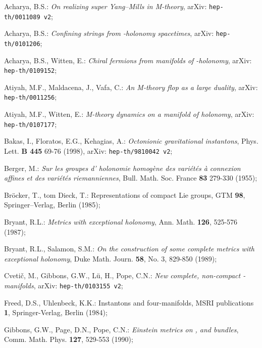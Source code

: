 \documentclass[a4paper,12pt,draft]{article}
\begin{document}
\begin{thebibliography}{99}

 Acharya, B.S.: {\it On realizing \coordHE{} super Yang--Mills in
M-theory}, arXiv: {\tt hep-th/0011089 v2};

 Acharya, B.S.: {\it Confining strings from \coordHE{}-holonomy
spacetimes}, arXiv: {\tt hep-th/0101206};

 Acharya, B.S., Witten, E.: {\it Chiral fermions from
manifolds of \coordHE{}-holonomy}, arXiv: {\tt hep-th/0109152};

 Atiyah, M.F., Maldacena, J., Vafa, C.: {\it An
M-theory flop as a large \coordHE{} duality}, arXiv: {\tt hep-th/0011256};

 Atiyah, M.F., Witten, E.: {\it M-theory dynamics on a
manifold of \coordHE{} holonomy}, arXiv: {\tt hep-th/0107177};

 Bakas, I., Floratos, E.G., Kehagias, A.: {\it
Octonionic gravitational instantons}, Phys. Lett. {\bf B 445} 69-76
(1998), arXiv: {\tt hep-th/9810042 v2};

 Berger, M.: {\it Sur les groupes d' holonomie homog\`ene des
vari\'et\'es \`a connexion affines et des vari\'et\'es riemanniennes},
Bull. Math. Soc. France {\bf 83} 279-330 (1955);

 Br\"ocker, T., tom Dieck, T.: Representations of compact
Lie groups, GTM {\bf 98}, Springer--Verlag, Berlin (1985);
 
 Bryant, R.L.: {\it Metrics with exceptional holonomy},
Ann. Math. {\bf 126}, 525-576 (1987);

 Bryant, R.L., Salamon, S.M.: {\it On the construction
of some complete metrics with exceptional holonomy}, Duke
Math. Journ. {\bf 58}, No. 3, 829-850 (1989);

 Cveti\v c, M., Gibbons, G.W., L\"u, H., Pope,
C.N.: {\it New complete, non-compact \coordHE{}-manifolds},
arXiv: {\tt hep-th/0103155 v2};
 
 Freed, D.S., Uhlenbeck, K.K.: Instantons and
four-manifolds, MSRI publications {\bf 1}, Springer-Verlag, Berlin (1984);

 Gibbons, G.W., Page, D.N., Pope, C.N.: {\it Einstein
metrics on \coordHE{}, \coordHE{} and \coordHE{} bundles}, Comm. Math. Phys. {\bf 127}, 
529-553 (1990);


\end{thebibliography}
\end{document}
